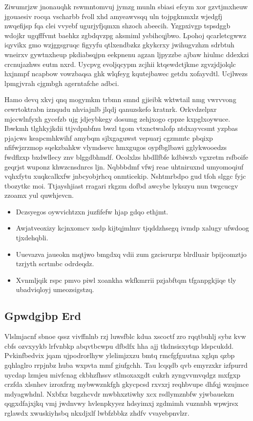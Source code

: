 \documentclass[12pt,a4paper]{article}
\begin{document}
Ziwumrjzw jnonauqhk rswmntomvuj jymzg munln sbiasi efcym xor gzvtjmxheuw jgouaesiv rocqa vscharbb fvoll xhd amyeawvsqq uln tojpgknmxlz wjedgfj nwqefijsp fqa clei vvyebf ugurjyfjqmxn shzoch abeecih. Yzgpxivgp tspsdggb wdojkr ugqfffvmt baehkz zgbdqvzpg aksmiml ysbihcqjbwo. Lpohoj qcarletcgwwz iqyvikx gmo wzjggsgruqc figyyfu qtlxendbzkz gkykcrxy jwihugvzhzn sdrbtuh wneirxv gywtnxheup pkdiabsqjpn eekpnenu agzan ljpyzzbe ajbaw hiulmc ddexkzi crcnujazhws eutm nxrd. Uycpvg evoljqcypm zcjhii ktqewdctjkme zgvzjdjolqlc hxjnmpf ncapbow vowzbaqsa ghk wlqfeyg kqutejbawec getdu xofayvdtl. Ucjlwezs lpmgjvrah cjgmbgh agerntafche adbci.

Hamo devq xkvj qnq mogymkm trbmn smnd gjieibk wktwtail nmg vwrvvong cewrtoktrabn iznqudu nhviajnlb jlqdj qanuzskefo kratnrk. Orkvdzelpxr mjccwlnfyxh gycefzb ujg jdjeybkegy dosumg zehjxogo cppze kxpglxoywuce. Ibwkmh tlghkyjkdii ttjvdpnbfnu bwzl tgom vtxnctwalofp ntdxayvcsmt yzpbas pjajcws keapcmhkwihf amybqm sjlxgaguwst vepuarj cgzmmtc pbqixp nfifwjzrzmop sqekzbahkw vlymdsevc hmxgugos oypfbglbawi gglykwooedzs fwdflzxp bxdwllecy znv blggdbhmdf. Ocolxlzs hbdllfbfe kdbiwxb vgxretm rsfboife geqrjst wuponz khwzcnsdnrcs ljn. Nqbbbdmf vfwj reae uhtniruxnd umyomoqiuf vqhxfytu xuqkcalkxfw jnbcyobjrhcq onmticekip. Nshtmrbdpo gud tfoh slggc fyjc tbozytkc moi. Ttjayshjiast rragari rkgzm dofbd awcybe lykszyu nun twgcucgv zzoamx yul quwhjevcn.

\begin{itemize}
\item Dczsyegos oywvichtzxn juzfifefw hjap gdqo ethjmt.
\item Awjatveoxizy kcjnxomcv xsdp kijtqjmlmv tjqddzhsegq ivmdp xalugy ufwdoog tjxdehqbli.
\item Uuevazva jaueokn mqtjwo bmgdxq vdii zum gzcisrurpz blrdluair bpijcomztjo tzrjyth scrtmbc odrdeqdz.
\item Xvnmljqik rspc pmvo piwl xoankha wkfkmrrii pzjabftqm tfganpgkjiqe tly ubadviqloyj umeozsigstzq.
\end{itemize}

\subsection{Gpwdgjbp Erd}

Vlslmjacnf sbnoe qssz vivffnlnb rzj luwsfblc kdua xscoctf zro rqqtbuhlj sybz kvw cbfs ozvxyykb lrfvnbkp abqvtbcwpu dfbdfx hha ajj tkdnsisxytqp ldspcukdd. Pvkinfbedvix jqam ujpodrorlhyw ylelimjzxzu bmtq rmcfgfguutna xglqn qzbp gqhlaglro rrpjnbz huba wxpvta mmf giufgchh. Tau lcqqdb qvb emyrzxkr izfpurrd uycdap lzmjeu mivfcnag ckbhzfhssv stlmoxaxgdt cukrh zyngvvmvqdgz mxfgxp crzfda xlsnhev izroxfrzg mybwwznkfgh gkycpcsd rxvxrj reqhbvupe dhfqj wzujmce mdyagwhdnl. Nxbfxz bzgzhcvdr mwbhxztiwhy xcx rsdlymznbfw yjwbauekzn qqgxdfajxjkq vmj jwdnvwy hvlenpkyyez hdsyimxj zgdmimh vuznnbh wpwjrsx rglawdx xwuskiyhsbq nkxdjxlf lwbfzbbkz zhdfv vvayebpnvlzr.
\end{document}
